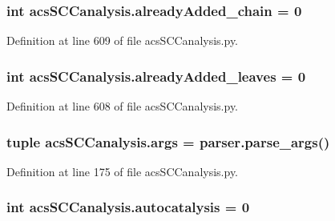 \hypertarget{a00130_ac1b286545469555eb284f9b5f2bd984f}{
\subsubsection[{already\+Added\+\_\+chain}]{\setlength{\rightskip}{0pt plus 5cm}int acs\+S\+C\+Canalysis.\+already\+Added\+\_\+chain = 0}}\label{a00130_ac1b286545469555eb284f9b5f2bd984f}


Definition at line 609 of file acs\+S\+C\+Canalysis.\+py.

\hypertarget{a00130_ac842390795cf193351c795945cde8e77}{
\subsubsection[{already\+Added\+\_\+leaves}]{\setlength{\rightskip}{0pt plus 5cm}int acs\+S\+C\+Canalysis.\+already\+Added\+\_\+leaves = 0}}\label{a00130_ac842390795cf193351c795945cde8e77}


Definition at line 608 of file acs\+S\+C\+Canalysis.\+py.

\hypertarget{a00130_aa0fabce811f34f18ba6ecbdd5bcbab6a}{
\subsubsection[{args}]{\setlength{\rightskip}{0pt plus 5cm}tuple acs\+S\+C\+Canalysis.\+args = parser.\+parse\+\_\+args()}}\label{a00130_aa0fabce811f34f18ba6ecbdd5bcbab6a}


Definition at line 175 of file acs\+S\+C\+Canalysis.\+py.

\hypertarget{a00130_a70ccd5d519e878c6c8a7d0aa73caf46c}{
\subsubsection[{autocatalysis}]{\setlength{\rightskip}{0pt plus 5cm}int acs\+S\+C\+Canalysis.\+autocatalysis = 0}}\label{a00130_a70ccd5d519e878c6c8a7d0aa73caf46c}


